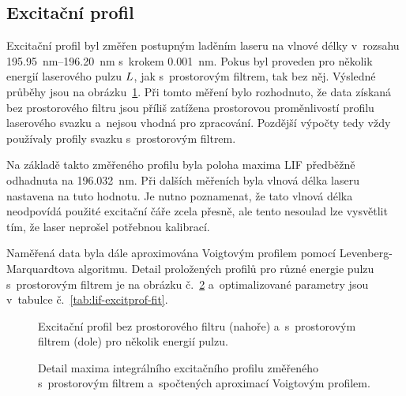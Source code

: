 \subsection{Excitační profil}
\label{sec:lif-excitprof}
Excitační profil byl změřen postupným laděním laseru na vlnové délky
v~rozsahu \SIrange{195.95}{196.20}{\nano\metre}
s~krokem \SI{0.001}{\nano\metre}.
Pokus byl proveden pro několik energií laserového pulzu $L$,
jak s~prostorovým filtrem, tak bez něj.
Výsledné průběhy jsou na obrázku~\ref{fig:lif-excitprof-filter}.
Při tomto měření bylo rozhodnuto, že data získaná bez prostorového
filtru jsou příliš zatížena prostorovou proměnlivostí profilu laserového
svazku a~nejsou vhodná pro zpracování.
Pozdější výpočty tedy vždy používaly profily svazku s~prostorovým filtrem.

Na základě takto změřeného profilu byla poloha maxima LIF předběžně
odhadnuta na \SI{196.032}{\nano\metre}.
Při dalších měřeních byla vlnová délka laseru na\-stavena na tuto hodnotu.
Je nutno poznamenat, že tato vlnová délka neodpovídá použité excitační čáře
zcela přesně, ale tento nesoulad lze vysvětlit tím,
že laser neprošel potřebnou kalibrací.

Naměřená data byla dále aproximována Voigtovým profilem pomocí
Le\-ven\-berg-Marquardtova algoritmu.
Detail proložených profilů pro různé energie pulzu s~prostorovým filtrem
je na obrázku č.~\ref{fig:lif-excitprof-fit}
a~optimalizované parametry jsou v~tabulce č.~\ref{tab:lif-excitprof-fit}.

\begin{figure}
	\centering
	
	\bigskip\par
	
	\caption{Excitační profil bez prostorového filtru (nahoře)
		a~s~prostorovým filtrem (dole) pro několik energií pulzu.}
	\label{fig:lif-excitprof-filter}
\end{figure}

\begin{figure}
	\centering
	
	\caption{Detail maxima integrálního excitačního profilu
		změřeného s~prostorovým filtrem
		a~spočtených aproximací Voigtovým profilem.}
	\label{fig:lif-excitprof-fit}
\end{figure}

